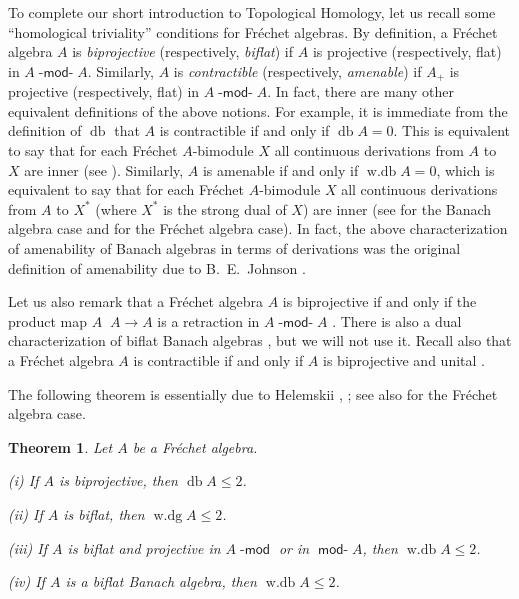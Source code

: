 \documentclass[12pt,reqno]{amsart}
\newtheorem*{theorem*}{Theorem}
\theoremstyle{definition}
\begin{document}
To complete our short introduction to Topological Homology, let us recall some
``homological triviality'' conditions for Fr\'echet algebras.
By definition, a Fr\'echet algebra $A$ is {\em biprojective}
(respectively, {\em biflat}) if $A$ is projective (respectively, flat)
in $A{\mbox{-}\!\mathop{\mathsf{mod}}\!\mbox{-}} A$. Similarly, $A$ is {\em contractible}
(respectively, {\em amenable}) if $A_+$ is projective (respectively, flat)
in $A{\mbox{-}\!\mathop{\mathsf{mod}}\!\mbox{-}} A$.
In fact, there are many other equivalent definitions of the above notions.
For example, it is immediate from the definition of ${\mathop{\mathrm{db}}}$ that
$A$ is contractible if and only if ${\mathop{\mathrm{db}}} A=0$. This is equivalent to say that
for each Fr\'echet $A$-bimodule $X$ all continuous derivations
from $A$ to $X$ are inner (see \cite[7.3.37]{X2}). Similarly, $A$ is amenable
if and only if ${\mathop{\mathrm{w.db}}} A=0$,
which is equivalent to say that for each Fr\'echet $A$-bimodule $X$ all continuous
derivations from $A$ to $X^*$ (where $X^*$ is the strong dual of $X$)
are inner (see \cite[7.3.37]{X2} for the Banach algebra case and
\cite[Corollary 3.5]{Pir_msb} for the Fr\'echet algebra case).
In fact, the above characterization of amenability of Banach algebras
in terms of derivations was the original definition
of amenability due to B.~E.~Johnson \cite{Johnson_CBA}.

Let us also remark that a Fr\'echet algebra $A$ is biprojective
if and only if the product map $A{\mathop{\widehat\otimes}} A\to A$ is a retraction
in $A{\mbox{-}\!\mathop{\mathsf{mod}}\!\mbox{-}} A$ \cite[IV.5.6]{X1}. There is also a dual characterization
of biflat Banach algebras \cite[VII.2.7]{X1}, but we will not use it.
Recall also that a Fr\'echet algebra $A$ is contractible if
and only if $A$ is biprojective and unital \cite[IV.5.8]{X1}.

The following theorem is essentially due to Helemskii \cite[V.2.28]{X1},
\cite[2.5.8]{X_HOA}; see also \cite[Proposition 4.8]{Pir_msb} for
the Fr\'echet algebra case.

\begin{theorem*}
Let $A$ be a Fr\'echet algebra.
\begin{compactenum}
\item[{\upshape (i)}] If $A$ is biprojective, then ${\mathop{\mathrm{db}}} A\le 2$.
\item[{\upshape (ii)}] If $A$ is biflat, then ${\mathop{\mathrm{w.dg}}} A\le 2$.
\item[{\upshape (iii)}] If $A$ is biflat and projective in $A{\mbox{-}\!\mathop{\mathsf{mod}}}$
or in ${\mathop{\mathsf{mod}}\!\mbox{-}} A$, then ${\mathop{\mathrm{w.db}}} A\le 2$.
\item[{\upshape (iv)}] If $A$ is a biflat Banach algebra, then ${\mathop{\mathrm{w.db}}} A\le 2$.
\end{compactenum}
\end{theorem*}
\end{document}
